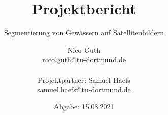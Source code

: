 \documentclass[
  fontsize=12pt,
  bibliography=totoc,     %
  captions=tableheading,  %
  titlepage=firstiscover, %
  parskip=half,           %
]{scrartcl}
\author{%
  Nico Guth\\%
  \href{mailto:nico.guth@tu-dortmund.de}{nico.guth@tu-dortmund.de}%
  \\ \\%
  \small Projektpartner: Samuel Haefs\\%
  \small \href{mailto:samuel.haefs@tu-dortmund.de}{samuel.haefs@tu-dortmund.de}%
}
\title{Projektbericht}
\subtitle{Segmentierung von Gewässern auf Satellitenbildern}
\date{Abgabe: 15.08.2021}
\begin{document}
\begin{spacing}{1}
  \maketitle
\end{spacing}
\thispagestyle{empty}
\tableofcontents
\newpage







\printbibliography{}
\end{document}
